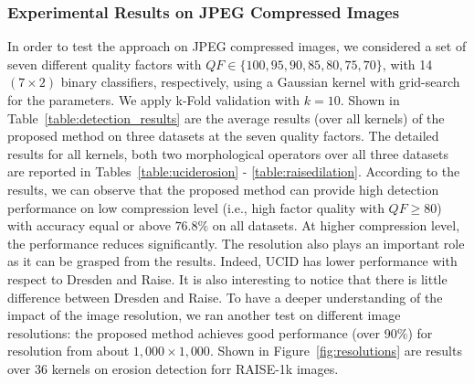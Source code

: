 \documentclass{ieeeaccess}
\begin{document}

\subsubsection{Experimental Results on JPEG Compressed Images}
%
In order to test the approach on JPEG compressed images, we considered a set of seven different quality factors with $QF \in \{100,95,90,85,80,75,70\}$, with 14 $(7\times 2)$ binary classifiers, respectively,
using a Gaussian kernel with grid-search for the parameters. We apply k-Fold validation with $k = 10$. Shown in Table~\ref{table:detection_results} are the average results (over all kernels) of the proposed method on three datasets at the seven quality factors. The detailed results for all kernels, both two morphological operators over all three datasets are reported in Tables~\ref{table:uciderosion} - \ref{table:raisedilation}. 
%
According to the results, we can observe that the proposed method can provide high detection performance on low compression level (i.e., high factor quality with $QF \ge 80$) with accuracy equal or above $76.8\%$ on all datasets. At higher compression level, the performance reduces significantly. The resolution also plays an important role as it can be grasped from the results. Indeed, UCID has lower performance with respect to Dresden and Raise. It is also interesting to notice that there is little difference between Dresden and Raise. To have a deeper understanding of the impact of the image resolution, we ran another test on different image resolutions: the proposed method achieves good performance (over 90\%) for resolution from about $1,000 \times 1,000$. Shown in Figure~\ref{fig:resolutions} are results over 36 kernels on erosion detection forr RAISE-1k images.%
\end{document}
